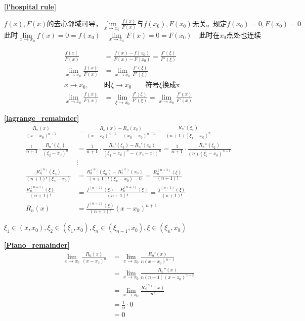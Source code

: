 \textbf{\large \ref{l'hospital rule}}
    \begin{center}
        $f(x),F(x)\mbox{的去心邻域可导，}\lim\limits_{x\to x_0}\frac{f(x)}{F(x)}\mbox{与}f(x_0),F(x_0)\mbox{无关。规定}f(x_0)=0,F(x_0)=0$\\
$\mbox{此时}\lim\limits_{x\to x_0}f(x)=0=f(x_0)\quad\lim\limits_{x\to x_0}F(x)=0=F(x_0)\quad\mbox{此时在$x_0$点处也连续}$\\
    \end{center}
    \begin{displaymath}
        \begin{split}
    \frac{f(x)}{F(x)}&=\frac{f(x)-f(x_0)}{F(x)-F(x_0)}=\frac{f'(\xi)}{F'(\xi)}\\
    \lim\limits_{x\to x_0}\frac{f(x)}{F(x)}&=\lim\limits_{x\to x_0}\frac{f'(\xi)}{F'(\xi)}\\
    x\rightarrow x_0,&\mbox{时}\xi\rightarrow x_0\qquad \mbox{符号$\xi$换成x}\\
    \lim\limits_{x\to x_0}\frac{f(x)}{F(x)}&=\lim\limits_{\xi\to x_0}\frac{f'(\xi)}{F'(\xi)}=\lim\limits_{x\to x_0}\frac{f'(x)}{F'(x)}
        \end{split}
    \end{displaymath}

\textbf{\large \ref{lagrange_remainder}}
\begin{displaymath}
    \begin{split}
        \frac{R_n(x)}{(x-x_0)^{n+1}}&=\frac{R_n(x)-R_n(x_0)}{(x-x_0)^{n+1}-(x_0-x_0)^{n+1}}=\frac{R_n'(\xi_1)}{(n+1)(\xi_1-x_0)^n}\\
        \frac{1}{n+1}\cdot\frac{R_n'(\xi_1)}{(\xi_2-x_0)^n}&=\frac{1}{n+1}\cdot\frac{R_n'(\xi_1)-R_n'(x_0)}{(\xi_1-x_0)^{n}-(x_0-x_0)^{n}}=\frac{1}{n+1}\cdot\frac{R_n''(\xi_2)}{(n)(\xi_2-x_0)^{n-1}}\\
        &\vdots\\
        \frac{R_n^{(n)}(\xi_n)}{(n+1)!(\xi_n-x_0)}&=\frac{R_n^{(n)}(\xi_n)-R_n^{(n)}(x_0)}{(n+1)!(\xi_n-x_0)-0}=\frac{R_n^{(n+1)}(\xi)}{(n+1)!}\\
        \frac{R_n^{(n+1)}(\xi)}{(n+1)!}&=\frac{f^{(n+1)}(\xi)-P_n^{(n+1)}(\xi)}{(n+1)!}=\frac{f^{(n+1)}(\xi)}{(n+1)!}\\
        R_n(x)&=\frac{f^{(n+1)}(\xi)}{(n+1)!}(x-x_0)^{n+1}
\end{split}
\end{displaymath}
\centerline{$\xi_1\in(x,x_0),\xi_2\in(\xi_1,x_0),\xi_n\in(\xi_{n-1},x_0),\xi\in(\xi_n,x_0)$}

\textbf{\large \ref{Piano_remainder}}
\begin{displaymath}
    \begin{split}
      \lim\limits_{x\to x_0}\frac{R_n(x)}{(x-x_0)^n}&=\lim\limits_{x\to x_0}\frac{R_n'(x)}{n(x-x_0)^{n-1}}\\
      &=\lim\limits_{x\to x_0}\frac{R_n''(x)}{n(n-1)(x-x_0)^{n-2}}\\
      &=\lim\limits_{x\to x_0}\frac{R_n^{(n)}(x)}{n!}\\
      &=\frac{1}{n}\cdot 0\\
      &=0
\end{split}
\end{displaymath}
